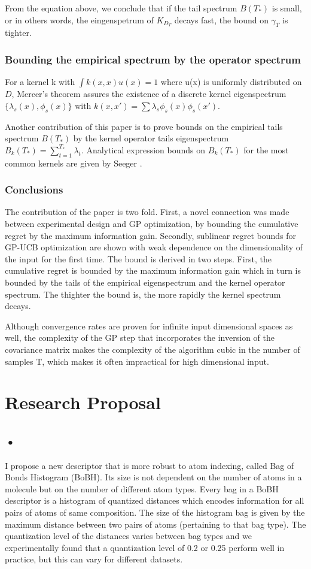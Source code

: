 \documentclass[10pt,journal,a4paper]{IEEEtran}
\begin{document}
From the equation above, we conclude that if the tail spectrum $B(T_{*})$ is small, or in others words, the eingenspetrum of $K_{D_T}$ decays fast, the bound on $\gamma_T$ is tighter.		
\subsubsection{Bounding the empirical spectrum by the operator spectrum}		
For a kernel k with $\int k(x,x)u(x)=1$ where u(x) is uniformly distributed on $D$, Mercer's theorem assures the existence of a discrete kernel eigenspectrum $\{\lambda_s(x), \phi_s(x) \}$		
with $k(x,x') = \sum \lambda_s\phi_s(x) \phi_s(x')$.	
		
Another contribution of this paper is to prove bounds on the empirical tails spectrum $B(T_{*})$ by the kernel operator tails eigenspectrum $B_k(T_{*}) = \sum_{t=1}^{T_*}\lambda_t $. Analytical expression bounds on $B_k(T_{*})$ for the most common kernels are given by Seeger \cite{NonGP}.		
		
\subsubsection{Conclusions}		
The contribution of the paper is two fold. First, a novel connection was made between experimental design and GP optimization, by bounding the cumulative regret by the maximum information gain. Secondly, sublinear regret bounds for GP-UCB optimization are shown with weak dependence on the dimensionality of the input for the first time. 		
 The bound is derived in two steps. First, the cumulative regret is bounded by the maximum information gain which in turn is bounded by the tails of the empirical eigenspectrum and the kernel operator spectrum. The thighter the bound is, the more rapidly the kernel spectrum decays. 

Although convergence rates are proven for infinite input dimensional spaces as well, the complexity of the GP step that incorporates the inversion of the covariance matrix makes the complexity of the algorithm cubic in the number of samples T, which makes it often impractical for high dimensional input.

\section{Research Proposal}
\subsection*{•}
I propose a new descriptor that is more robust to atom indexing, called Bag of Bonds Histogram (BoBH). Its size is not dependent on the number of atoms in a molecule but on the number of different atom types. Every bag in a BoBH descriptor is a histogram of quantized distances which encodes information for all pairs of atoms of same composition. The size of the histogram bag is given by the maximum distance between two pairs of atoms (pertaining to that bag type). The quantization level of the distances varies between bag types and we experimentally found that a quantization level of 0.2 or 0.25 perform well in practice, but this can vary for different datasets.
\end{document}
